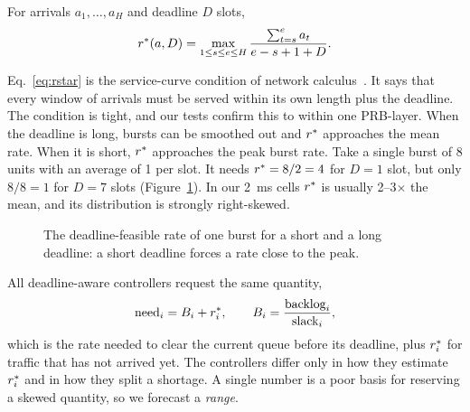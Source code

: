 \begin{definition}
For arrivals $a_1,\dots,a_H$ and deadline $D$ slots,
\begin{equation}
  r^{\ast}(a, D) = \max_{1\le s\le e\le H} \frac{\sum_{t=s}^{e} a_t}{e - s + 1 + D}.
  \label{eq:rstar}
\end{equation}
\end{definition}

Eq.~\eqref{eq:rstar} is the service-curve condition of network calculus~\cite{leboudec2001}. It says that every window of arrivals must be served within its own length plus the deadline. The condition is tight, and our tests confirm this to within one PRB-layer. When the deadline is long, bursts can be smoothed out and $r^{\ast}$ approaches the mean rate. When it is short, $r^{\ast}$ approaches the peak burst rate. Take a single burst of 8 units with an average of 1 per slot. It needs $r^{\ast} = 8/2 = 4$ for $D=1$ slot, but only $8/8 = 1$ for $D=7$ slots (Figure~\ref{fig:rstar}). In our 2~ms cells $r^{\ast}$ is usually 2--3$\times$ the mean, and its distribution is strongly right-skewed.

\begin{figure}[H]
\centering
{}
\caption{The deadline-feasible rate of one burst for a short and a long deadline: a short deadline forces a rate close to the peak.}
\label{fig:rstar}
\end{figure}

All deadline-aware controllers request the same quantity,
\begin{equation}
  \text{need}_i = B_i + r^{\ast}_i, \qquad B_i = \frac{\text{backlog}_i}{\text{slack}_i},
\end{equation}
which is the rate needed to clear the current queue before its deadline, plus $r^{\ast}_i$ for traffic that has not arrived yet. The controllers differ only in how they estimate $r^{\ast}_i$ and in how they split a shortage. A single number is a poor basis for reserving a skewed quantity, so we forecast a \emph{range}.


